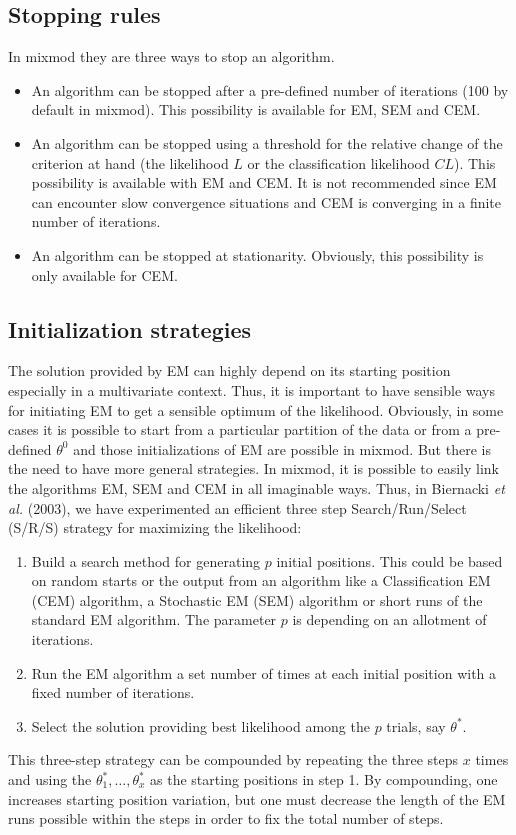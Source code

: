 \documentclass[12pt]{article}
\begin{document}
\subsection{Stopping rules}
In {\sc mixmod} they are three ways to stop an algorithm.
\begin{itemize}
\item An algorithm can be stopped after a pre-defined number of iterations (100 by default in
  {\sc mixmod}). This possibility is available for EM, SEM and CEM.
\item An algorithm can be stopped using a threshold for the relative change of the criterion at
  hand (the likelihood $L$ or the classification likelihood $CL$). This possibility is
  available with EM and CEM.  It is not recommended since EM can encounter slow convergence
  situations and CEM is converging in a finite number of iterations.
\item An algorithm can be stopped at stationarity. Obviously, this possibility is only
  available for CEM.
\end{itemize}

\subsection{Initialization strategies}
The solution provided by EM can highly depend on its starting position especially in a
multivariate context. Thus, it is important to have sensible ways for initiating EM to get a
sensible optimum of the likelihood. Obviously, in some cases it is possible to start from a
particular partition of the data or from a pre-defined $\theta^0$ and those initializations of
EM are possible in {\sc mixmod}. But there is the need to have more general strategies. In {\sc
  mixmod}, it is possible to easily link the algorithms EM, SEM and CEM in all imaginable ways.
Thus, in Biernacki {\it et al.} (2003), we have experimented an efficient three step
Search/Run/Select (S/R/S) strategy for maximizing the likelihood:
\begin{enumerate}
\item Build a search method for generating $p$ initial positions. This could be based on random
  starts or the output from an algorithm like a Classification EM (CEM) algorithm, a Stochastic
  EM (SEM) algorithm or short runs of the standard EM algorithm. The parameter $p$ is depending
  on an allotment of iterations.
\item Run the EM algorithm a set number of times at each initial position with a fixed number
  of iterations.
\item Select the solution providing best likelihood among the $p$ trials, say $\theta^*$.
\end{enumerate}
This three-step strategy can be compounded by repeating the three steps $x$ times and using the
$\theta_1^*,\ldots,\theta_x^*$ as the starting positions in step 1. By compounding, one
increases starting position variation, but one must decrease the length of the EM runs possible
within the steps in order to fix the total number of steps.
\end{document}
